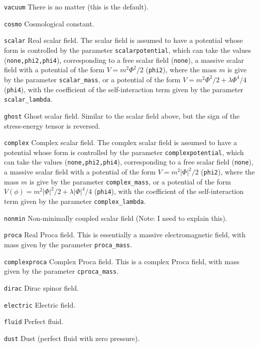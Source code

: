 \documentclass[12pt]{article}
\begin{document}
\begin{list}{}{
\setlength{\leftmargin}{35mm}
\setlength{\labelsep}{10mm}
\setlength{\labelwidth}{30mm}}

\item[\texttt{vacuum}] There is no matter (this is the default).

\item[\texttt{cosmo}] Cosmological constant.

\item[\texttt{scalar}] Real scalar field.  The scalar field is assumed
  to have a potential whose form is controlled by the parameter
  \texttt{scalarpotential}, which can take the values
  (\texttt{none,phi2,phi4}), corresponding to a free scalar field
  (\texttt{none}), a massive scalar field with a
  potential of the form $V=m^2 \Phi^2/2$
  (\texttt{phi2}), where the mass $m$ is give by the
  parameter \texttt{scalar\_mass}, or a potential of the form
  $V=m^2 \Phi^2/2 + \lambda \Phi^4 / 4$
  (\texttt{phi4}), with the coefficient of the
  self-interaction term given by the parameter
  \texttt{scalar\_lambda}.

\item[\texttt{ghost}] Ghost scalar field. Similar to the scalar field
  above, but the sign of the stress-energy tensor is reversed.

\item[\texttt{complex}] Complex scalar field.  The complex scalar
  field is assumed to have a potential whose form is controlled by the
  parameter \texttt{complexpotential}, which can take the values
  (\texttt{none,phi2,phi4}), corresponding to a free scalar field
  (\texttt{none}), a massive scalar field with a potential of the form
  $V=m^2 |\Phi|^2/2$ (\texttt{phi2}), where the mass $m$ is give by
  the parameter \texttt{complex\_mass}, or a potential of the form
  $V(\phi)=m^2 |\Phi|^2/2 + \lambda |\Phi|^4 / 4$ (\texttt{phi4}),
  with the coefficient of the self-interaction term given by the
  parameter \texttt{complex\_lambda}.

\item[\texttt{nonmin}] Non-minimally coupled scalar field (Note: I
  need to explain this).

\item[\texttt{proca}] Real Proca field. This is essentially
a massive electromagnetic field, with mass given by the
parameter \texttt{proca\_mass}.

\item[\texttt{complexproca}] Complex Proca field. This is a complex
  Proca field, with mass given by the parameter \texttt{cproca\_mass}.

\item[\texttt{dirac}] Dirac spinor field.

\item[\texttt{electric}] Electric field.

\item[\texttt{fluid}] Perfect fluid.

\item[\texttt{dust}] Dust (perfect fluid with zero pressure).

\end{list}
\end{document}
